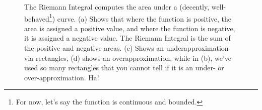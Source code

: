     \begin{figure}[htb]%
\centering
{}%
\hspace{5pt}%
%
\newline
	\centering
{}%
\hspace{5pt}%
%
    \caption[]{The Riemann Integral computes the area under a (decently, well-behaved\footnote{For now, let's say the function is continuous and bounded.}) curve. (a) Shows that where the function is positive, the area is assigned a positive value, and where the function is negative, it is assigned a negative value. The Riemann Integral is the sum of the positive and negative areas. (c) Shows an underapproximation via rectangles, (d) shows an overapproximation, while in (b), we've used so many rectangles that you cannot tell if it is an under- or over-approximation. Ha!}
    \label{fig:RiemannIntegralSignedAreaUnderCurve}
\end{figure}

